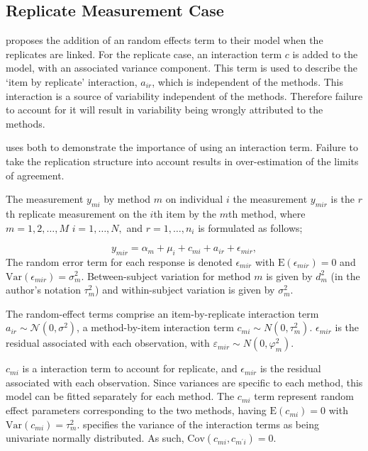 \documentclass[12pt, a4paper]{report}
\theoremstyle{plain}
\theoremstyle{definition}
\theoremstyle{remark}
\begin{document}
	\subsection*{Replicate Measurement Case}
	
\citet{BXC2008} proposes the addition of an random effects term to their model when the replicates are linked. For the replicate case, an interaction term $c$ is added to the model, with an associated variance component. This term is used to describe the `item by replicate' interaction, $a_{ir}$, which is independent of the methods. This interaction is a source of variability independent of the methods. Therefore failure to account for it will result in variability being wrongly attributed to the methods.
	
\citet{BXC2008} uses both to demonstrate the importance of using an interaction term. Failure to take the replication structure into account results in over-estimation of the limits of agreement.

The measurement $y_{mi}$ by method $m$ on individual $i$ the measurement $y_{mir} $ is the $r$th replicate measurement on the $i$th item by the $m$th method, where $m=1,2,\ldots,M$ $i=1,\ldots,N,$ and $r = 1,\ldots,n_i$ is formulated as follows;


	\begin{equation}
		y_{mir}  = \alpha_{m} + \mu_{i} + c_{mi} + a_{ir} + \epsilon_{mir},
\label{BXC-full}
	\end{equation}
The random error term for each response is denoted $\epsilon_{mir}$ with $\mathrm{E}(\epsilon_{mir})=0$ and $\mathrm{Var}(\epsilon_{mir})=\sigma^2_m$. Between-subject variation for method $m$ is given by $d^2_{m}$ (in the author's notation $\tau^2_m$) and within-subject variation is given by $\sigma^2_{m}$.

The random-effect terms comprise an item-by-replicate interaction term $a_{ir} \sim \mathcal{N}(0,\sigma^{2})$, a method-by-item interaction term $c_{mi} \sim N(0,\tau^{2}_{m})$. $\epsilon_{mir}$ is the residual associated with each observation, with $\varepsilon_{mir} \sim N(0,\varphi^{2}_{m})$. 

$c_{mi}$ is a interaction term to account for replicate, and $\epsilon_{mir}$ is the residual associated with each observation. Since variances are specific to each method, this model can be
fitted separately for each method. The $c_{mi}$ term represent random effect parameters corresponding to the two methods, having $\mathrm{E}(c_{mi})= 0$ with $\mathrm{Var}(c_{mi})=\tau^2_m$. \citet{BXC2008} specifies the variance of the interaction terms as being univariate normally distributed. As such, $\mathrm{Cov}(c_{mi}, c_{m^\prime i})= 0.$
\end{document}
